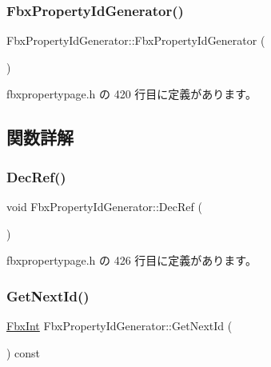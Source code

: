 \subsubsection{\texorpdfstring{Fbx\+Property\+Id\+Generator()}{FbxPropertyIdGenerator()}}
{\footnotesize\ttfamily Fbx\+Property\+Id\+Generator\+::\+Fbx\+Property\+Id\+Generator (\begin{DoxyParamCaption}{ }\end{DoxyParamCaption})\hspace{0.3cm}{\ttfamily [inline]}}



 fbxpropertypage.\+h の 420 行目に定義があります。



\subsection{関数詳解}
\mbox{\label{class_fbx_property_id_generator_a64a7faa5d20848c3d8817a6c01ed0298}} 
\subsubsection{\texorpdfstring{Dec\+Ref()}{DecRef()}}
{\footnotesize\ttfamily void Fbx\+Property\+Id\+Generator\+::\+Dec\+Ref (\begin{DoxyParamCaption}{ }\end{DoxyParamCaption})\hspace{0.3cm}{\ttfamily [inline]}}



 fbxpropertypage.\+h の 426 行目に定義があります。

\mbox{\label{class_fbx_property_id_generator_a39bb3de3a2a11a1a281ee1e98a0035db}} 
\subsubsection{\texorpdfstring{Get\+Next\+Id()}{GetNextId()}}
{\footnotesize\ttfamily \hyperlink{fbxtypes_8h_a088fa96de3b0b3ea69f0f6afef525dfb}{Fbx\+Int} Fbx\+Property\+Id\+Generator\+::\+Get\+Next\+Id (\begin{DoxyParamCaption}{ }\end{DoxyParamCaption}) const\hspace{0.3cm}{\ttfamily [inline]}}



